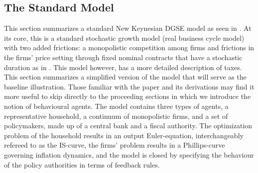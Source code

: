 \documentclass[11pt]{article}
\newcommand{\bb}{\bigbreak\noindent}
\begin{document}
\begin{spacing}{2}
\section{The Standard Model}
This section summarizes a standard New Keynesian DGSE model as seen in \cite{correia2013unconventional}.
At its core, this is a standard stochastic growth model (real business cycle model) with two added frictions: a monopolistic competition among firms and frictions in the firms' price setting through fixed nominal contracts that have a stochastic duration as in \cite{calvo1983staggered}. This model however, has a more detailed description of taxes. This section summarizes a simplified version of the model that will serve as the baseline illustration. Those familiar with the paper and its derivations may find it more useful to skip directly to the proceeding sections in which we introduce the notion of behavioural agents.
\bb
The model contains three types of agents, a representative household, a continuum of monopolistic firms, and a set of policymakers, made up of a central bank and a fiscal authority. The optimization problem of the household results in an output Euler-equation, interchangeably refereed to as the IS-curve, the firms' problem results in a Phillips-curve governing inflation dynamics, and the model is closed by specifying the behaviour of the policy authorities in terms of feedback rules.


\end{spacing}
\end{document}
